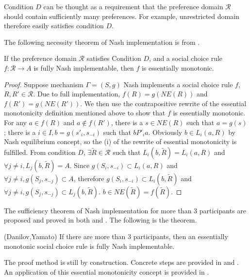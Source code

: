 Condition $D$ can be thought as a requirement that the preference
domain $\mathscr{R}$ should contain sufficiently many
preferences. For example, unrestricted domain therefore easily
satisfies condition $D$.

The following necessity theorem of Nash implementation is
from \parencite{Yamato1992}.

\begin{thm*}
If the preference domain $\mathscr{R}$ satisfies Condition $D$, and
a social choice rule $f :\mathscr{R} \rightarrow A$ is fully Nash
implementable, then $f$ is essentially monotonic.

\end{thm*}

\begin{proof}
Suppose mechanism $\Gamma=(S,g)$ Nash implements a  social choice rule
$f$, $R, R' \in \mathscr{R}$. Due to full implementation, $f(R)=
g(NE(R))$ and $f(R')= g(NE(R'))$. We then use  the contrapositive rewrite of
the essential monotonicity definition mentioned above to show that $f$
is essentially monotonic. For any $a \in f(R)$ and $a \not \in f(R')$,
there is a $ s \in NE(R)$ such that $a =g(s)$ ; there is a $i \in I, b
= g(s'_i, s_{-i})$ such that  $ b P'_i a$. Obviously  $b \in L_i(a,
R)$ by Nash equilibrium concept, so the (i) of the rewrite
of essential monotonicity is fulfilled. From condition $D$, $\exists
\tilde{R} \in \mathscr{R}$ such that $L_i(b, \tilde{R})=L_i(a,R)$
and $\forall j \not = i, L_j(b, \tilde{R})=A$. Since $g(S_i, s_{-i})
\subset L_i(a,R) $ and $\forall j\not = i, g(S_j, s_{-j}) \subset A$, therefore $g(S_i, s_{-i})
\subset L_i(b, \tilde{R}) $ and $\forall j \not = i, g(S_j, s_{-j})
\subset L_j(b, \tilde{R})$. $b \in NE(\tilde{R}) = f(\tilde{R})$.
\end{proof}

The sufficiency theorem of Nash implementation for more than 3
participants are proposed and proved in both \parencite{Danilov1992}
and \parencite{Yamato1992}. The following is the theorem.

\begin{thm*}(Danilov,Yamato)
If there are more than 3 participants, then an essentially monotonic
social choice rule  is fully Nash implementable.
\end{thm*}
The proof method is still by construction. Concrete steps are provided in \parencite{Danilov1992}
and \parencite{Yamato1992}.  An application of this essential monotonicity concept is provided
in \parencite{SonmezJet1996}.

